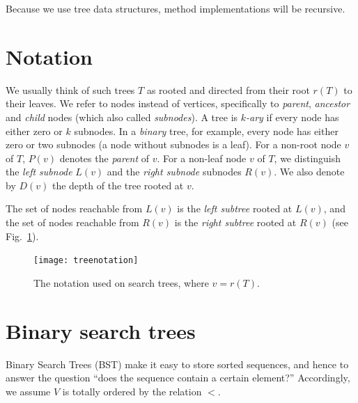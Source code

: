 \documentclass[a4paper]{book}
\theoremstyle{changebreak}                %
\begin{document}
Because we use tree data structures, method
implementations will be recursive.

\section{Notation}
We usually think of such trees $T$ as rooted and
directed from their root $r(T)$ to
their leaves. We refer to nodes instead of
vertices, specifically to {\it
  parent}, {\it ancestor} and
{\it child} nodes (which also called {\it
  subnodes}). A tree is {\it
  $k$-ary} if every node has either zero or $k$
subnodes. In a {\it binary} tree, for example,
every node has either zero or two subnodes (a node without subnodes is
a leaf). For a non-root node $v$ of $T$, $P(v)$
denotes the {\it parent} of $v$. For a non-leaf
node $v$ of $T$, we distinguish the {\it left
  subnode} $L(v)$ and the {\it right
  subnode} subnodes $R(v)$. We also denote by
$D(v)$ the depth of the tree rooted at $v$.

The set of nodes reachable from $L(v)$ is the {\it left
  subtree} rooted at $L(v)$, and the set of nodes
reachable from $R(v)$ is the {\it right subtree}
rooted at $R(v)$ (see Fig.~\ref{f:searchtree}).
\begin{figure}[!ht]
\begin{center}
\texttt{[image: treenotation]}
\end{center}
\caption{The notation used on search trees, where $v=r(T)$.}
\label{f:searchtree}
\end{figure}

\section{Binary search trees}
Binary Search Trees (BST) make it
easy to store sorted sequences, and hence to
answer the question ``does the sequence contain a certain element?''
Accordingly, we assume $V$ is totally ordered
by the relation $<$.
\end{document}
